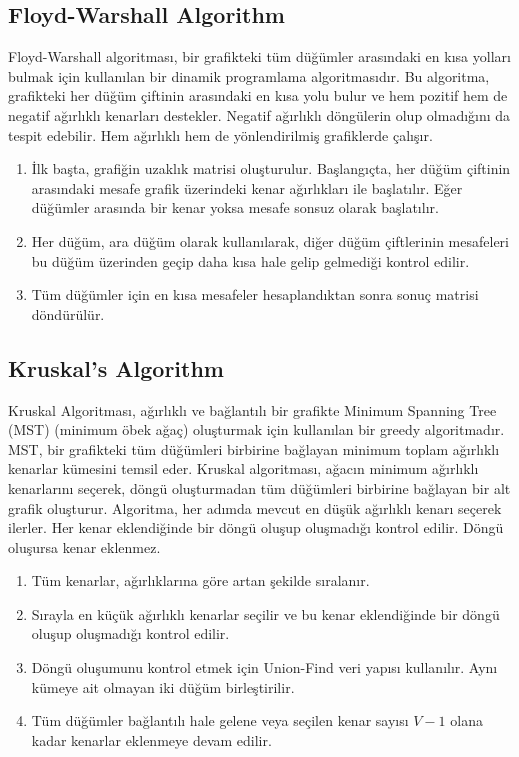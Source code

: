 \newpage

\subsection{Floyd-Warshall Algorithm}

Floyd-Warshall algoritması, bir grafikteki tüm düğümler arasındaki en kısa yolları bulmak için kullanılan bir dinamik programlama algoritmasıdır. Bu algoritma, grafikteki her düğüm çiftinin arasındaki en kısa yolu bulur ve hem pozitif hem de negatif ağırlıklı kenarları destekler. Negatif ağırlıklı döngülerin olup olmadığını da tespit edebilir. Hem ağırlıklı hem de yönlendirilmiş grafiklerde çalışır.

\begin{enumerate}
    \item İlk başta, grafiğin uzaklık matrisi oluşturulur. Başlangıçta, her düğüm çiftinin arasındaki mesafe grafik üzerindeki kenar ağırlıkları ile başlatılır. Eğer düğümler arasında bir kenar yoksa mesafe sonsuz olarak başlatılır.
    \item Her düğüm, ara düğüm olarak kullanılarak, diğer düğüm çiftlerinin mesafeleri bu düğüm üzerinden geçip daha kısa hale gelip gelmediği kontrol edilir.
    \item Tüm düğümler için en kısa mesafeler hesaplandıktan sonra sonuç matrisi döndürülür.
\end{enumerate}

\newpage

\subsection{Kruskal's Algorithm}

Kruskal Algoritması, ağırlıklı ve bağlantılı bir grafikte Minimum Spanning Tree (MST) (minimum öbek ağaç) oluşturmak için kullanılan bir greedy algoritmadır. MST, bir grafikteki tüm düğümleri birbirine bağlayan minimum toplam ağırlıklı kenarlar kümesini temsil eder. Kruskal algoritması, ağacın minimum ağırlıklı kenarlarını seçerek, döngü oluşturmadan tüm düğümleri birbirine bağlayan bir alt grafik oluşturur. Algoritma, her adımda mevcut en düşük ağırlıklı kenarı seçerek ilerler. Her kenar eklendiğinde bir döngü oluşup oluşmadığı kontrol edilir. Döngü oluşursa kenar eklenmez. 

\begin{enumerate}
    \item Tüm kenarlar, ağırlıklarına göre artan şekilde sıralanır.
    \item Sırayla en küçük ağırlıklı kenarlar seçilir ve bu kenar eklendiğinde bir döngü oluşup oluşmadığı kontrol edilir.
    \item Döngü oluşumunu kontrol etmek için Union-Find veri yapısı kullanılır. Aynı kümeye ait olmayan iki düğüm birleştirilir.
    \item Tüm düğümler bağlantılı hale gelene veya seçilen kenar sayısı $V - 1$ olana kadar kenarlar eklenmeye devam edilir.
\end{enumerate}

